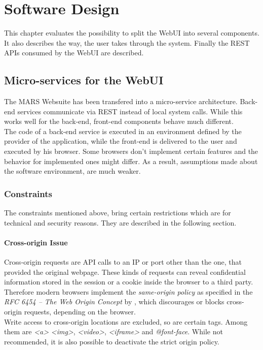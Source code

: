 
\chapter{Software Design}
This chapter evaluates the possibility to split the WebUI into several components. It also describes the way, the user takes through the system. Finally the REST APIs consumed by the WebUI are described.



\section{Micro-services for the WebUI}
\label{sec:MS_for_WebUI}
The MARS Websuite has been transfered into a micro-service architecture. Back-end services communicate via REST instead of local system calls. While this works well for the back-end, front-end components behave much different.\\
The code of a back-end service is executed in an environment defined by the provider of the application, while the front-end is delivered to the user and executed by his browser. Some browsers don't implement certain features and the behavior for implemented ones might differ. As a result, assumptions made about the software environment, are much weaker. 


\subsection{Constraints}
The constraints mentioned above, bring certain restrictions which are for technical and security reasons. They are described in the following section.

\subsubsection{Cross-origin Issue}
Cross-origin requests are API calls to an IP or port other than the one, that provided the original webpage. These kinds of requests can reveal confidential information stored in the session or a cookie inside the browser to a third party.\\
Therefore modern browsers implement the \textit{same-origin policy} as specified in the \textit{RFC 6454 -- The Web Origin Concept} by \cite{barth2011web}, which discourages or blocks cross-origin requests, depending on the browser.\\
Write access to cross-origin locations are excluded, so are certain tags. Among them are \textit{<a>} \textit{<img>}, \textit{<video>}, \textit{<iframe>} and \textit{@font-face}. While not recommended, it is also possible to deactivate the strict origin policy.

